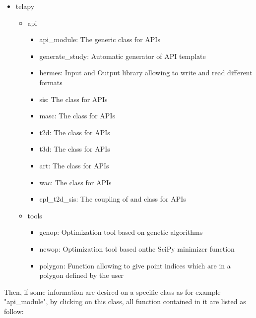 \begin{itemize}
\item telapy
\begin{itemize}
\item api
\begin{itemize}
\item api\_module: The generic \python class for \telemacsystem APIs
\item generate\_study: Automatic generator of \telemacsystem API template \python
\item hermes: Input and Output library allowing to write and read different
  \telemacsystem formats
\item sis: The \sisyphe \python class for APIs
\item masc: The \mascaret \python class for APIs
\item t2d: The  \python class for APIs
\item t3d: The  \python class for APIs
\item art: The \artemis \python class for APIs
\item wac: The \tomawac \python class for APIs
\item cpl\_t2d\_sis: The \python coupling of  and \sisyphe class for APIs
\end{itemize}
\end{itemize}
\begin{itemize}
\item tools
\begin{itemize}
\item genop: Optimization tool based on genetic algorithms
\item newop: Optimization tool based onthe SciPy minimizer function
\item polygon: Function allowing to give point indices which are in a polygon
  defined by the user
\end{itemize}
\end{itemize}
\end{itemize}

Then, if some information are desired on a specific class as for example
"api\_module", by clicking on this class, all function contained in it are listed
as follow:

